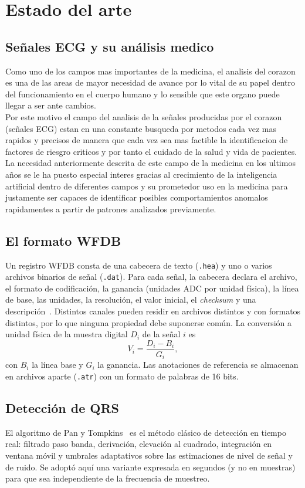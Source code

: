 \section{Estado del arte}
\subsection{Señales ECG y su análisis medico}
Como uno de los campos mas importantes de la medicina, el analisis del corazon es una de las areas de mayor necesidad de avance por lo vital de su papel dentro del funcionamiento en el cuerpo humano y lo sensible que este organo puede llegar a ser ante cambios.
\\
Por este motivo el campo del analisis de la señales producidas por el corazon (señales ECG) estan en una constante busqueda por metodos cada vez mas rapidos y precisos de manera que cada vez sea mas factible la identificacion de factores de riesgro criticos y por tanto el cuidado de la salud y vida de pacientes. La necesidad anteriormente descrita de este campo de la medicina en los ultimos años se le ha puesto especial interes gracias al crecimiento de la inteligencia artificial dentro de diferentes campos y su prometedor uso en la medicina para justamente ser capaces de identificar posibles comportamientos anomalos rapidamentes a partir de patrones analizados previamente. \cite{MtECG} 
\subsection{El formato WFDB}
Un registro WFDB consta de una cabecera de texto (\texttt{.hea}) y uno o varios archivos binarios de señal (\texttt{.dat}). Para cada señal, la cabecera declara el archivo, el formato de codificación, la ganancia (unidades ADC por unidad física), la línea de base, las unidades, la resolución, el valor inicial, el \emph{checksum} y una descripción~\cite{wfdb}. Distintos canales pueden residir en archivos distintos y con formatos distintos, por lo que ninguna propiedad debe suponerse común. La conversión a unidad física de la muestra digital $D_i$ de la señal $i$ es
\begin{equation}
V_i=\frac{D_i-B_i}{G_i},
\label{eq:conv}
\end{equation}
con $B_i$ la línea base y $G_i$ la ganancia. Las anotaciones de referencia se almacenan en archivos aparte (\texttt{.atr}) con un formato de palabras de 16 bits.

\subsection{Detección de QRS}
El algoritmo de Pan y Tompkins~\cite{pantompkins1985} es el método clásico de detección en tiempo real: filtrado paso banda, derivación, elevación al cuadrado, integración en ventana móvil y umbrales adaptativos sobre las estimaciones de nivel de señal y de ruido. Se adoptó aquí una variante expresada en segundos (y no en muestras) para que sea independiente de la frecuencia de muestreo.

